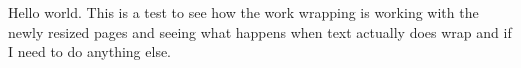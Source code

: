 \documentclass[12pt]{article}
\begin{document}
\noindent Hello world. This is a test to see how the work wrapping is
working with the newly resized pages and seeing what happens when text
actually does wrap and if I need to do anything else.
\end{document}
